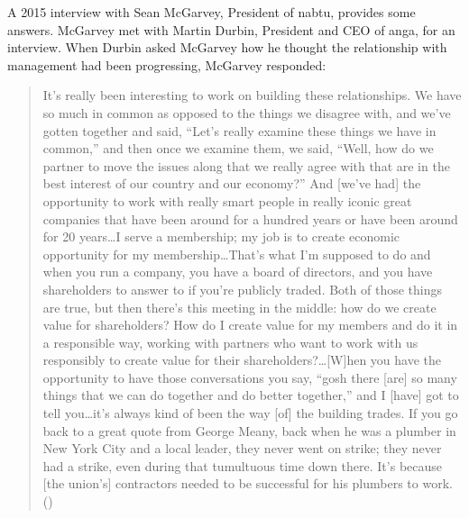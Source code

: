 A 2015 interview with Sean McGarvey, President of \acrshort{nabtu}, provides some answers. McGarvey met with Martin Durbin, President and CEO of \acrfull{anga}, for an interview. When Durbin asked McGarvey how he thought the relationship with management had been progressing, McGarvey responded:

\begin{quote}
It’s really been interesting to work on building these relationships. We have so much in common as opposed to the things we disagree with, and we've gotten together and said, “Let's really examine these things we have in common,” and then once we examine them, we said, “Well, how do we partner to move the issues along that we really agree with that are in the best interest of our country and our economy?” And [we’ve had] the opportunity to work with really smart people in really iconic great companies that have been around for a hundred years or have been around for 20 years\ldots{}I serve a membership; my job is to create economic opportunity for my membership\ldots{}That's what I'm supposed to do and when you run a company, you have a board of directors, and you have shareholders to answer to if you're publicly traded. Both of those things are true, but then there's this meeting in the middle: how do we create value for shareholders? How do I create value for my members and do it in a responsible way, working with partners who want to work with us responsibly to create value for their shareholders?\ldots{}[W]hen you have the opportunity to have those conversations you say, “gosh there [are] so many things that we can do together and do better together,” and I [have] got to tell you\ldots{}it's always kind of been the way [of] the building trades. If you go back to a great quote from George Meany, back when he was a plumber in New York City and a local leader, they never went on strike; they never had a strike, even during that tumultuous time down there. It's because [the union’s] contractors needed to be successful for his plumbers to work. (\cite{natgasnowNextInfrastructureChallenge2015})
\end{quote}

